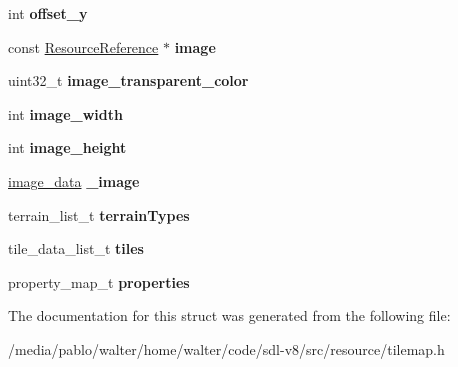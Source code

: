 \begin{DoxyCompactItemize}
int {\bfseries offset\+\_\+y}
\item 
\mbox{\label{structtileset__data_adddbdaebb00afa95ef1ff84f26ff9d9c}} 
const \mbox{\hyperlink{classResourceReference}{Resource\+Reference}} $\ast$ {\bfseries image}
\item 
\mbox{\label{structtileset__data_ad85c2143546089036b6765f70985739f}} 
uint32\+\_\+t {\bfseries image\+\_\+transparent\+\_\+color}
\item 
\mbox{\label{structtileset__data_a72d7feae98ab07a13845b2a44890ae0f}} 
int {\bfseries image\+\_\+width}
\item 
\mbox{\label{structtileset__data_a0d5debd0b9764d53bfd935adc11af5ab}} 
int {\bfseries image\+\_\+height}
\item 
\mbox{\label{structtileset__data_abb790f0fcc76a8e58421c2a0e5458d20}} 
\mbox{\hyperlink{structimage__data}{image\+\_\+data}} {\bfseries \+\_\+image}
\item 
\mbox{\label{structtileset__data_aafb3af4512fce835815119e2fb51c9e4}} 
terrain\+\_\+list\+\_\+t {\bfseries terrain\+Types}
\item 
\mbox{\label{structtileset__data_a0eb0d2945028ce2c57f91472a2f645bb}} 
tile\+\_\+data\+\_\+list\+\_\+t {\bfseries tiles}
\item 
\mbox{\label{structtileset__data_ab6ef00776d334804ee2778a54b6e420c}} 
property\+\_\+map\+\_\+t {\bfseries properties}
\end{DoxyCompactItemize}


The documentation for this struct was generated from the following file\+:\begin{DoxyCompactItemize}
\item 
/media/pablo/walter/home/walter/code/sdl-\/v8/src/resource/tilemap.\+h\end{DoxyCompactItemize}
